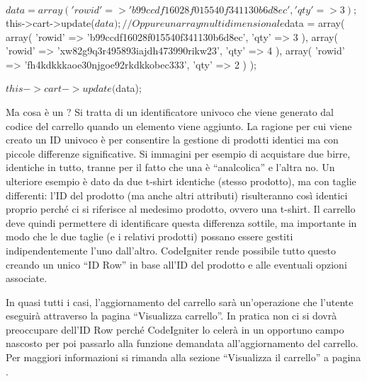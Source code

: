 \begin{code}
$data = array(
               'rowid' => 'b99ccdf16028f015540f341130b6d8ec',
               'qty'   => 3
            );

$this->cart->update($data); 

// Oppure un array multidimensionale

$data = array(
               array(
                       'rowid'   => 'b99ccdf16028f015540f341130b6d8ec',
                       'qty'     => 3
                    ),
               array(
                       'rowid'   => 'xw82g9q3r495893iajdh473990rikw23',
                       'qty'     => 4
                    ),
               array(
                       'rowid'   => 'fh4kdkkkaoe30njgoe92rkdkkobec333',
                       'qty'     => 2
                    )
            );

$this->cart->update($data);
\end{code}

Ma cosa è un ? Si tratta di un identificatore univoco che viene generato dal codice del carrello quando un elemento viene aggiunto. La ragione per cui viene creato un ID univoco è per consentire la gestione di prodotti identici ma con piccole differenze significative. Si immagini per esempio di acquistare due birre, identiche in tutto, tranne per il fatto che una è ``analcolica'' e l'altra no. Un ulteriore esempio è dato da due t-shirt identiche (stesso prodotto), ma con taglie differenti: l'ID del prodotto (ma anche altri attributi) risulteranno così identici proprio perché ci si riferisce al medesimo prodotto, ovvero una t-shirt. Il carrello deve quindi permettere di identificare questa differenza sottile, ma importante in modo che le due taglie (e i relativi prodotti) possano essere gestiti indipendentemente l'uno dall'altro. CodeIgniter rende possibile tutto questo creando un unico ``ID Row'' in base all'ID del prodotto e alle eventuali opzioni associate.

In quasi tutti i casi, l'aggiornamento del carrello sarà un'operazione che l'utente eseguirà attraverso la pagina ``Visualizza carrello''. In pratica non ci si dovrà preoccupare dell'ID Row perché CodeIgniter lo celerà in un opportuno campo nascosto per poi passarlo alla funzione demandata all'aggiornamento del carrello. Per maggiori informazioni si rimanda alla sezione ``Visualizza il carrello'' a pagina \pageref{sec:vedicarrello}. 


